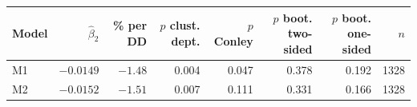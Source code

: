 \begin{tabular}{lrrrrrrr}
\toprule
Model & $\hat\beta_2$ & \% per DD & \shortstack{$p$ clust.\\dept.} & \shortstack{$p$\\Conley} & \shortstack{$p$ boot.\\two-sided} & \shortstack{$p$ boot.\\one-sided} & $n$ \\
\midrule
M1 & $-0.0149$ & $-1.48$ & 0.004 & 0.047 & 0.378 & 0.192 & 1328 \\
M2 & $-0.0152$ & $-1.51$ & 0.007 & 0.111 & 0.331 & 0.166 & 1328 \\
\bottomrule
\end{tabular}
